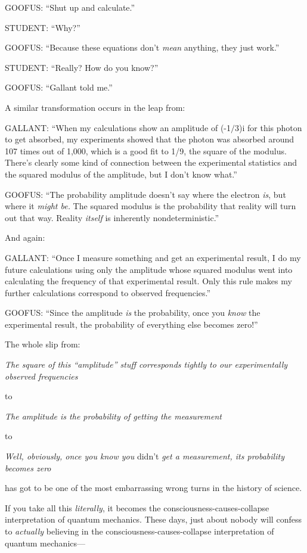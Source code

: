 {
 GOOFUS: ``Shut up and
calculate.''}

{
 STUDENT: ``Why?''}

{
 GOOFUS: ``Because these equations
don't \textit{mean} anything, they just
work.''}

{
 STUDENT: ``Really? How do you
know?''}

{
 GOOFUS: ``Gallant told me.''}

{
 A similar transformation occurs in the leap from:}

{
 GALLANT: ``When my calculations show an amplitude
of (-1$/$3)i for this photon to get absorbed, my experiments showed
that the photon was absorbed around 107 times out of 1,000, which is a
good fit to 1/9, the square of the modulus. There's
clearly some kind of connection between the experimental statistics and
the squared modulus of the amplitude, but I don't know
what.''}

{
 GOOFUS: ``The probability amplitude
doesn't say where the electron \textit{is}, but where
it \textit{might be.} The squared modulus is the probability that
reality will turn out that way. Reality \textit{itself} is inherently
nondeterministic.''}

{
 And again:}

{
 GALLANT: ``Once I measure something and get an
experimental result, I do my future calculations using only the
amplitude whose squared modulus went into calculating the frequency of
that experimental result. Only this rule makes my further calculations
correspond to observed frequencies.''}

{
 GOOFUS: ``Since the amplitude \textit{is} the
probability, once you \textit{know} the experimental result, the
probability of everything else becomes zero!''}

{
 The whole slip from:}

{
 \textit{The square of this
``amplitude'' stuff corresponds
tightly to our experimentally observed frequencies}}

{
 to}

{
 \textit{The amplitude is the probability of getting the
measurement}}

{
 to}

{
 \textit{Well, obviously, once you know you} didn't
\textit{get a measurement, its probability becomes zero}}

{
 has got to be one of the most embarrassing wrong turns in the
history of science.}

{
 If you take all this \textit{literally}, it becomes the
consciousness-causes-collapse interpretation of quantum mechanics.
These days, just about nobody will confess to \textit{actually}
believing in the consciousness-causes-collapse interpretation of
quantum mechanics---}

